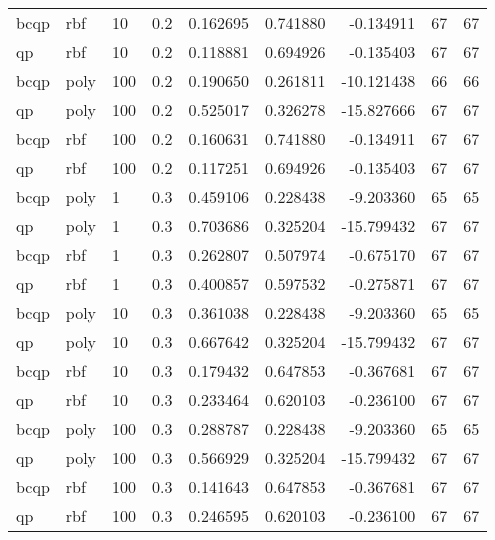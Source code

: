 \begin{tabular}{llllrrrrr}
bcqp &    rbf &  10 &     0.2 &  0.162695 &  0.741880 &  -0.134911 &           67 &         67 \\
  qp &    rbf &  10 &     0.2 &  0.118881 &  0.694926 &  -0.135403 &           67 &         67 \\
bcqp &   poly & 100 &     0.2 &  0.190650 &  0.261811 & -10.121438 &           66 &         66 \\
  qp &   poly & 100 &     0.2 &  0.525017 &  0.326278 & -15.827666 &           67 &         67 \\
bcqp &    rbf & 100 &     0.2 &  0.160631 &  0.741880 &  -0.134911 &           67 &         67 \\
  qp &    rbf & 100 &     0.2 &  0.117251 &  0.694926 &  -0.135403 &           67 &         67 \\
bcqp &   poly &   1 &     0.3 &  0.459106 &  0.228438 &  -9.203360 &           65 &         65 \\
  qp &   poly &   1 &     0.3 &  0.703686 &  0.325204 & -15.799432 &           67 &         67 \\
bcqp &    rbf &   1 &     0.3 &  0.262807 &  0.507974 &  -0.675170 &           67 &         67 \\
  qp &    rbf &   1 &     0.3 &  0.400857 &  0.597532 &  -0.275871 &           67 &         67 \\
bcqp &   poly &  10 &     0.3 &  0.361038 &  0.228438 &  -9.203360 &           65 &         65 \\
  qp &   poly &  10 &     0.3 &  0.667642 &  0.325204 & -15.799432 &           67 &         67 \\
bcqp &    rbf &  10 &     0.3 &  0.179432 &  0.647853 &  -0.367681 &           67 &         67 \\
  qp &    rbf &  10 &     0.3 &  0.233464 &  0.620103 &  -0.236100 &           67 &         67 \\
bcqp &   poly & 100 &     0.3 &  0.288787 &  0.228438 &  -9.203360 &           65 &         65 \\
  qp &   poly & 100 &     0.3 &  0.566929 &  0.325204 & -15.799432 &           67 &         67 \\
bcqp &    rbf & 100 &     0.3 &  0.141643 &  0.647853 &  -0.367681 &           67 &         67 \\
  qp &    rbf & 100 &     0.3 &  0.246595 &  0.620103 &  -0.236100 &           67 &         67 \\
\bottomrule
\end{tabular}

